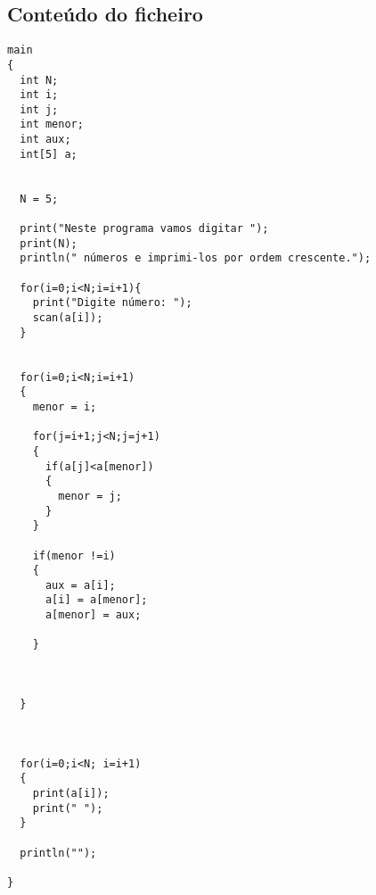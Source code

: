 \documentclass[11pt,a4paper]{report}%
\begin{document}
\subsection{Conteúdo do ficheiro}

\begin{verbatim}
main
{
  int N;
  int i;
  int j;
  int menor;
  int aux;
  int[5] a;
  

  N = 5;

  print("Neste programa vamos digitar ");
  print(N);
  println(" números e imprimi-los por ordem crescente.");

  for(i=0;i<N;i=i+1){
    print("Digite número: ");
    scan(a[i]); 
  }
  

  for(i=0;i<N;i=i+1)
  {
    menor = i;

    for(j=i+1;j<N;j=j+1)
    {
      if(a[j]<a[menor])
      {
        menor = j;
      }
    }
    
    if(menor !=i)
    {
      aux = a[i];
      a[i] = a[menor];
      a[menor] = aux;

    }



  } 



  for(i=0;i<N; i=i+1)
  {
    print(a[i]);
    print(" ");
  }

  println("");
  
}
\end{verbatim}
\end{document}
